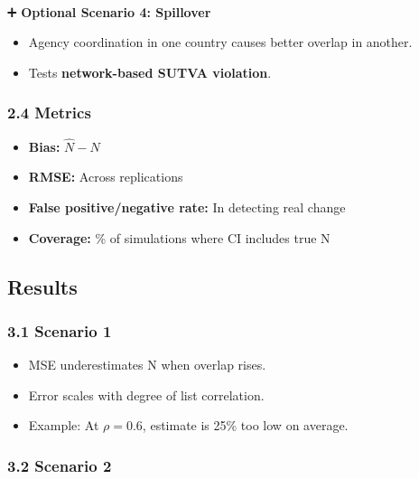 \documentclass[
  12pt,
]{article}
\makeatletter
\let\oldparagraph\paragraph
\renewcommand{\paragraph}{
    \@ifstar
      \xxxParagraphStar
      \xxxParagraphNoStar
  }
\newcommand{\xxxParagraphStar}[1]{\oldparagraph*{#1}\mbox{}}
\newcommand{\xxxParagraphNoStar}[1]{\oldparagraph{#1}\mbox{}}
\theoremstyle{plain}
\theoremstyle{definition}
\makeatother
\begin{document}
\paragraph{\texorpdfstring{➕ \textbf{Optional Scenario 4:
Spillover}}{➕ Optional Scenario 4: Spillover}}\label{optional-scenario-4-spillover}

\begin{itemize}
\item
  Agency coordination in one country causes better overlap in another.
\item
  Tests \textbf{network-based SUTVA violation}.
\end{itemize}

\subsubsection{\texorpdfstring{\textbf{2.4
Metrics}}{2.4 Metrics}}\label{metrics}

\begin{itemize}
\item
  \textbf{Bias:} \(\hat{N} - N\)
\item
  \textbf{RMSE:} Across replications
\item
  \textbf{False positive/negative rate:} In detecting real change
\item
  \textbf{Coverage:} \% of simulations where CI includes true N
\end{itemize}

\subsection{Results}\label{results}

\subsubsection{\texorpdfstring{\textbf{3.1 Scenario
1}}{3.1 Scenario 1}}\label{scenario-1}

\begin{itemize}
\item
  MSE underestimates N when overlap rises.
\item
  Error scales with degree of list correlation.
\item
  Example: At \(\rho = 0.6\), estimate is 25\% too low on average.
\end{itemize}

\subsubsection{\texorpdfstring{\textbf{3.2 Scenario
2}}{3.2 Scenario 2}}\label{scenario-2}
\end{document}
